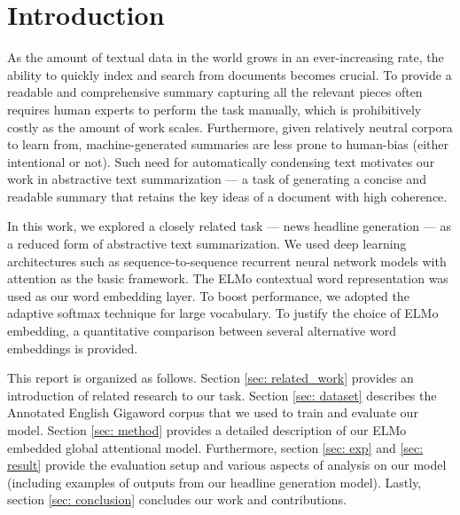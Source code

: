 \section{Introduction}

As the amount of textual data in the world grows in an ever-increasing rate, the ability to quickly index and search from documents becomes crucial. To provide a readable and comprehensive summary capturing all the relevant pieces often requires human experts to perform the task manually, which is prohibitively costly as the amount of work scales. Furthermore, given relatively neutral corpora to learn from, machine-generated summaries are less prone to human-bias (either intentional or not). Such need for automatically condensing text motivates our work in abstractive text summarization --- a task of generating a concise and readable summary that retains the key ideas of a document with high coherence. 

In this work, we explored a closely related task --- news headline generation --- as a reduced form of abstractive text summarization. We used deep learning architectures such as sequence-to-sequence recurrent neural network models with attention as the basic framework. The ELMo contextual word representation \cite{peters2018deep} was used as our word embedding layer. To boost performance, we adopted the adaptive softmax technique \cite{grave2016efficient} for large vocabulary. To justify the choice of ELMo embedding, a quantitative comparison between several alternative word embeddings is provided. 

This report is organized as follows. Section \ref{sec: related_work} provides an introduction of related research to our task. Section \ref{sec: dataset} describes the Annotated English Gigaword corpus \cite{graff2003english} that we used to train and evaluate our model. Section \ref{sec: method} provides a detailed description of our ELMo embedded global attentional model. Furthermore, section \ref{sec: exp} and \ref{sec: result} provide the evaluation setup and various aspects of analysis on our model (including examples of outputs from our headline generation model). Lastly, section \ref{sec: conclusion} concludes our work and contributions. 

